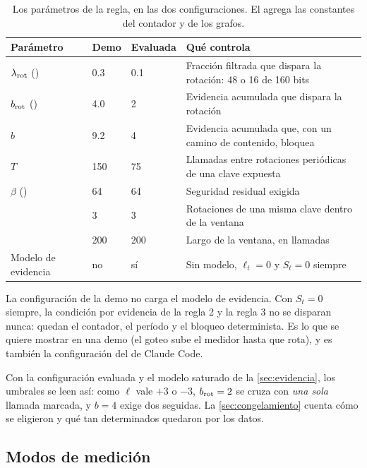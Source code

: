 \begin{table}[ht]
\caption{Los parámetros de la regla, en las dos configuraciones. El  agrega las
constantes del contador y de los grafos.}\label{tab:params}
\small
\begin{tabularx}{\textwidth}{@{}P{2.6cm}R{1.6cm}R{1.9cm}L@{}}
\toprule
Parámetro & Demo & Evaluada & Qué controla \\
\midrule
$\lambda_{\mathrm{rot}}$ () & \num{0.3} & \num{0.1} & Fracción filtrada que dispara la rotación: 48 o
  16 de 160 bits \\
$b_{\mathrm{rot}}$ () & \num{4.0} & \num{2} & Evidencia acumulada que dispara la rotación \\
$b$ & \num{9.2} & \num{4} & Evidencia acumulada que, con un camino de contenido, bloquea \\
$T$ & 150 & 75 & Llamadas entre rotaciones periódicas de una clave expuesta \\
$\beta$ () & 64 & 64 & Seguridad residual exigida \\
 & 3 & 3 & Rotaciones de una misma clave dentro de la ventana \\
 & 200 & 200 & Largo de la ventana, en llamadas \\
Modelo de evidencia & no & sí & Sin modelo, $\ell_t = 0$ y $S_t = 0$ siempre \\
\bottomrule
\end{tabularx}
\end{table}

La configuración de la demo no carga el modelo de evidencia. Con $S_t = 0$ siempre, la condición por
evidencia de la regla 2 y la regla 3 no se disparan nunca: quedan el contador, el período y el bloqueo
determinista. Es lo que se quiere mostrar en una demo (el goteo sube el medidor hasta que rota), y es
también la configuración del  de Claude Code.

Con la configuración evaluada y el modelo saturado de la \cref{sec:evidencia}, los umbrales se leen
así: como $\ell$ vale $+3$ o $-3$, $b_{\mathrm{rot}} = 2$ se cruza con \emph{una sola} llamada marcada, y $b = 4$
exige dos seguidas. La \cref{sec:congelamiento} cuenta cómo se eligieron y qué tan determinados
quedaron por los datos.

\subsection{Modos de medición}

